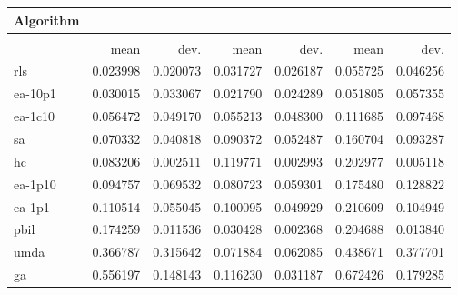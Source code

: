 \begin{tabular}{@{} l *{6}{>{{}}N{1}{2}} @{}}
\toprule
{Algorithm} &  \\
\midrule
&  &  &  \\
\midrule
& {mean} & {dev.} & {mean} & {dev.} & {mean} & {dev.} \\
\midrule
rls & 0.023998 & 0.020073 & 0.031727 & 0.026187 & 0.055725 & 0.046256 \\
ea-10p1 & 0.030015 & 0.033067 & 0.021790 & 0.024289 & 0.051805 & 0.057355 \\
ea-1c10 & 0.056472 & 0.049170 & 0.055213 & 0.048300 & 0.111685 & 0.097468 \\
sa & 0.070332 & 0.040818 & 0.090372 & 0.052487 & 0.160704 & 0.093287 \\
hc & 0.083206 & 0.002511 & 0.119771 & 0.002993 & 0.202977 & 0.005118 \\
ea-1p10 & 0.094757 & 0.069532 & 0.080723 & 0.059301 & 0.175480 & 0.128822 \\
ea-1p1 & 0.110514 & 0.055045 & 0.100095 & 0.049929 & 0.210609 & 0.104949 \\
pbil & 0.174259 & 0.011536 & 0.030428 & 0.002368 & 0.204688 & 0.013840 \\
umda & 0.366787 & 0.315642 & 0.071884 & 0.062085 & 0.438671 & 0.377701 \\
ga & 0.556197 & 0.148143 & 0.116230 & 0.031187 & 0.672426 & 0.179285 \\
\bottomrule
\end{tabular}
